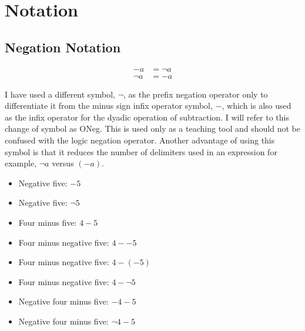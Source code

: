 \documentclass[20150903-160354-rs2.2-MarksMathNotebook.tex]{subfiles}
\begin{document}
%
%

\chapter{Notation}

\section{Negation Notation}
\begin{notations}

\begin{subequations}
\begin{align}
-a &= \neg a \label{eq:oneg1} \\
\neg a &= -a \label{eq:oneg2}
\end{align}
\end{subequations}

I have used a different symbol, $\neg$, as the prefix negation operator only to differentiate it from the minus sign infix operator symbol, $-$, which is also used as the infix operator for the dyadic operation of subtraction.  I will refer to this change of symbol as ONeg.  This is used only as a teaching tool and should not be confused with the logic negation operator.  Another advantage of using this symbol is that it reduces the number of delimiters used in an expression for example, $\neg a$ versus $(-a)$.

\begin{itemize}
	\item Negative five: $-5$
	\item Negative five: $\neg 5$
	\item Four minus five: $4-5$
	\item Four minus negative five: $4--5$
	\item Four minus negative five: $4-(-5)$
	\item Four minus negative five: $4-\neg 5$
	\item Negative four minus five: $-4-5$
	\item Negative four minus five: $\neg 4-5$
\end{itemize}

\end{notations}

\end{document}
